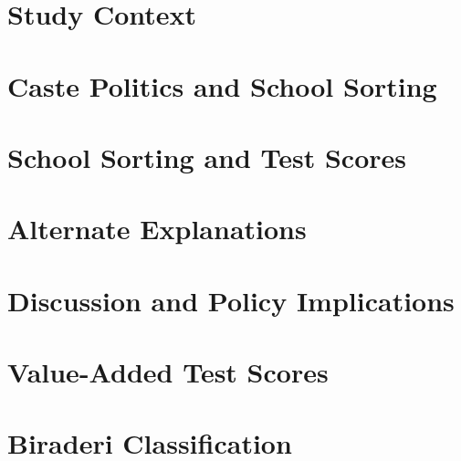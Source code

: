 \documentclass[11pt]{article}
\begin{document}
	

\section{Study Context}\label{pk_context}

	

\section{Caste Politics and School Sorting}\label{pk_sorting} %

	


\section{School Sorting and Test Scores}\label{pk_scores}

	


\section{Alternate Explanations}\label{pk_alternatives}

	

\section{Discussion and Policy Implications}\label{pk_conclusion}

	

\pagebreak

	
	

\appendix

\section{Value-Added Test Scores}\label{appendix_valueadded}

	
\clearpage

\section{Biraderi Classification}\label{appendix_classification}

	
\end{document}
